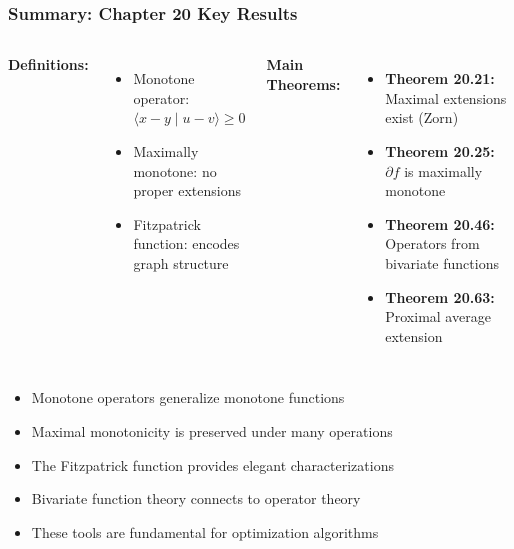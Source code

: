 \documentclass[aspectratio=169,10pt]{beamer}
\newcommand{\inprod}[2]{\langle #1 \mid #2 \rangle}
\begin{document}
\begin{frame}
    \frametitle{Summary: Chapter 20 Key Results}

    \begin{columns}[T]

        \textbf{Definitions:}
        \begin{itemize}
            \item Monotone operator: $\inprod{x-y}{u-v} \geq 0$
            \item Maximally monotone: no proper extensions
            \item Fitzpatrick function: encodes graph structure
        \end{itemize}


        \textbf{Main Theorems:}
        \begin{itemize}
            \item \textbf{Theorem 20.21:} Maximal extensions exist (Zorn)
            \item \textbf{Theorem 20.25:} $\partial f$ is maximally monotone
            \item \textbf{Theorem 20.46:} Operators from bivariate functions
            \item \textbf{Theorem 20.63:} Proximal average extension
        \end{itemize}
    \end{columns}

    \vspace{2em}

    \begin{itemize}
        \item Monotone operators generalize monotone functions
        \item Maximal monotonicity is preserved under many operations
        \item The Fitzpatrick function provides elegant characterizations
        \item Bivariate function theory connects to operator theory
        \item These tools are fundamental for optimization algorithms
    \end{itemize}
\end{frame}
\end{document}
